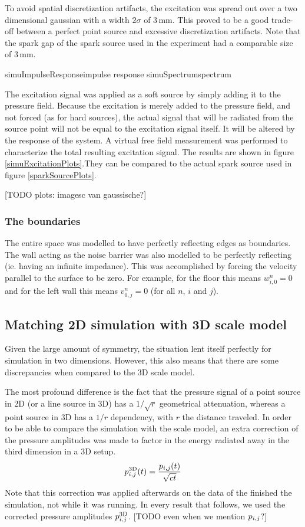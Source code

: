 To avoid spatial discretization artifacts, the excitation was spread out over a two dimensional gaussian with a width $2\sigma$ of 3\,mm. This proved to be a good trade-off between a perfect point source and excessive discretization artifacts. Note that the spark gap of the spark source used in the experiment had a comparable size of 3\,mm.

	{simuImpulseResponse}{impulse response}
	{simuSpectrum}{spectrum}

The excitation signal was applied as a soft 
source\cite{soft-hard-source} by simply adding it to the 
pressure field. Because the excitation is merely added to the pressure 
field, and not forced (as for hard sources), the actual signal that will be 
radiated from the source point will not be equal to the excitation signal 
itself. It will be altered by the response of the system. A virtual free 
field measurement was performed to characterize the total resulting 
excitation signal. The results are shown in figure \ref{simuExcitationPlots}.They can be compared to the actual spark source used in figure \ref{sparkSourcePlots}. 


[TODO plots: imagesc van gaussische?]


\subsubsection*{The boundaries}
The entire space was modelled to have perfectly reflecting edges as boundaries. The wall acting as the noise barrier was also modelled to be perfectly reflecting (ie. having an infinite impedance). This was accomplished by forcing the velocity parallel to the surface to be zero. For example, for the floor this means $w_{i,0}^n = 0$ and for the left wall this means $v_{0,j}^n = 0$ (for all $n$, $i$ and $j$).



\subsection{Matching 2D simulation with 3D scale model}
Given the large amount of symmetry, the situation lent itself perfectly for simulation in two dimensions. However, this also means that there are some discrepancies when compared to the 3D scale model.

The most profound difference is the fact that the pressure signal of a point source in 2D (or a line source in 3D) has a $1/\sqrt{r}$ geometrical attenuation, whereas a point source in 3D has a $1/r$ dependency, with $r$ the distance traveled. In order to be able to compare the simulation with the scale model, an extra correction of the pressure amplitudes was made to factor in the energy radiated away in the third dimension in a 3D setup.
$$
p_{i,j}^{\mathrm{3D}}(t) = \frac{p_{i,j}(t)}{\sqrt{ct}}
$$
Note that this correction was applied afterwards on the data of the finished the simulation, not while it was running. In every result that follows, we used the corrected pressure amplitudes $p_{i,j}^{\mathrm{3D}}$. [TODO even when we mention $p_{i,j}$?]

